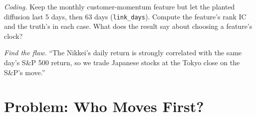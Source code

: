 \begin{exercise}[$\star\star\star$]\label{exo:rs:cross-sectional-and-cross-asset-features:7}
\emph{Coding.} Keep the monthly customer-momentum feature but let the planted diffusion last 5 days, then 63 days
(\texttt{link\_days}). Compute the feature's rank IC and the truth's in each case. What does the result say about choosing a feature's
clock?
\end{exercise}

\begin{exercise}[$\star\star\star$]\label{exo:rs:cross-sectional-and-cross-asset-features:8}
\emph{Find the flaw.} ``The Nikkei's daily return is strongly correlated with the same day's S\&P 500 return, so we trade Japanese
stocks at the Tokyo close on the S\&P's move.''
\end{exercise}

\section{Problem: Who Moves First?}

